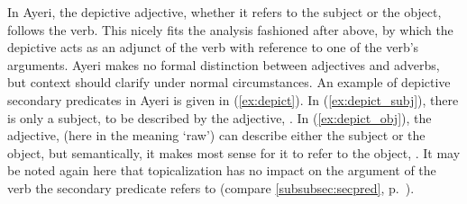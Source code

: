 In Ayeri, the depictive adjective, whether it refers to the subject or the
object, follows the verb. This nicely fits the analysis fashioned after
\citet{mueller2002} above, by which the depictive acts as an adjunct of the
verb with reference to one of the verb's arguments. Ayeri makes no formal
distinction between adjectives and adverbs, but context should clarify under
normal circumstances. An example of depictive secondary predicates in Ayeri is
given in (\ref{ex:depict}). In (\ref{ex:depict_subj}), there is only a subject,
 to be described by the adjective, . In
(\ref{ex:depict_obj}), the adjective,  (here in the
meaning `raw') can describe either the subject or the object, but semantically,
it makes most sense for it to refer to the object, . It
may be noted again here that topicalization has no impact on the argument of
the verb the secondary predicate refers to (compare 
\autoref{subsubsec:secpred}, p.~\pageref{subsubsec:secpred}).

